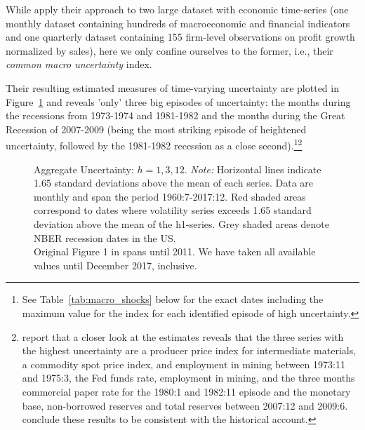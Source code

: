 \documentclass[a4paper,11pt,listof=nochaptergap,oneside,pointednumbers,bibtotoc,bigheadings,liststotoc]{scrbook}
\begin{document}
While \citet{juradoetal:15} apply their approach to two large dataset with economic time-series (one monthly dataset containing hundreds of macroeconomic and financial indicators and one quarterly dataset containing 155 firm-level observations on profit growth normalized by sales), here we only confine ourselves to the former, i.e., their \textit{common macro uncertainty} index.

Their resulting estimated measures of time-varying uncertainty are plotted in Figure~\ref{fig:macroUncertainty_index} and reveals 'only' three big episodes of uncertainty: the months during the recessions from 1973-1974 and 1981-1982 and the months during the Great Recession of 2007-2009 (being the most striking episode of heightened uncertainty, followed by the 1981-1982 recession as a close second).\footnote{See Table~\ref{tab:macro_shocks} below for the exact dates including the maximum value for the index for each identified episode of high uncertainty.}\footnote{\citet{juradoetal:15} report that a closer look at the estimates reveals that the three series with the highest uncertainty are a producer price index for intermediate materials, a commodity spot price index, and employment in mining between 1973:11 and 1975:3, the Fed funds rate, employment in mining, and the three months commercial paper rate for the 1980:1 and 1982:11 episode and the monetary base, non-borrowed reserves and total reserves between 2007:12 and 2009:6. \citet{juradoetal:15} conclude these results to be consistent with the historical account.}

\begin{figure}[!ht]
   \centering
   \setlength\fboxsep{0pt}
   \setlength\fboxrule{0pt}
      \caption[Aggregate Uncertainty: $h = 1, 3, 12$.]{Aggregate Uncertainty: $h = 1, 3, 12$.
      \textit{Note:} Horizontal lines indicate 1.65 standard deviations above the mean of each series. Data are monthly and span the period 1960:7-2017:12. Red shaded areas correspond to dates where volatility series exceeds 1.65 standard deviation above the mean of the h1-series. Grey shaded areas denote NBER recession dates in the US.\\
      Original Figure 1 in \citet{juradoetal:15} spans until 2011. We have taken all available values until December 2017, inclusive.}   \label{fig:macroUncertainty_index}
\end{figure}
\end{document}
